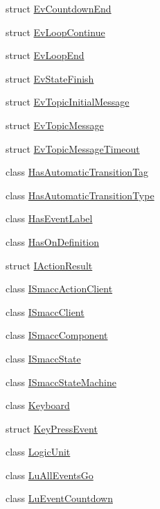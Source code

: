 \begin{DoxyCompactItemize}
\item 
struct \hyperlink{structsmacc_1_1EvCountdownEnd}{Ev\+Countdown\+End}
\item 
struct \hyperlink{structsmacc_1_1EvLoopContinue}{Ev\+Loop\+Continue}
\item 
struct \hyperlink{structsmacc_1_1EvLoopEnd}{Ev\+Loop\+End}
\item 
struct \hyperlink{structsmacc_1_1EvStateFinish}{Ev\+State\+Finish}
\item 
struct \hyperlink{structsmacc_1_1EvTopicInitialMessage}{Ev\+Topic\+Initial\+Message}
\item 
struct \hyperlink{structsmacc_1_1EvTopicMessage}{Ev\+Topic\+Message}
\item 
struct \hyperlink{structsmacc_1_1EvTopicMessageTimeout}{Ev\+Topic\+Message\+Timeout}
\item 
class \hyperlink{classsmacc_1_1HasAutomaticTransitionTag}{Has\+Automatic\+Transition\+Tag}
\item 
class \hyperlink{classsmacc_1_1HasAutomaticTransitionType}{Has\+Automatic\+Transition\+Type}
\item 
class \hyperlink{classsmacc_1_1HasEventLabel}{Has\+Event\+Label}
\item 
class \hyperlink{classsmacc_1_1HasOnDefinition}{Has\+On\+Definition}
\item 
struct \hyperlink{structsmacc_1_1IActionResult}{I\+Action\+Result}
\item 
class \hyperlink{classsmacc_1_1ISmaccActionClient}{I\+Smacc\+Action\+Client}
\item 
class \hyperlink{classsmacc_1_1ISmaccClient}{I\+Smacc\+Client}
\item 
class \hyperlink{classsmacc_1_1ISmaccComponent}{I\+Smacc\+Component}
\item 
class \hyperlink{classsmacc_1_1ISmaccState}{I\+Smacc\+State}
\item 
class \hyperlink{classsmacc_1_1ISmaccStateMachine}{I\+Smacc\+State\+Machine}
\item 
class \hyperlink{classsmacc_1_1Keyboard}{Keyboard}
\item 
struct \hyperlink{structsmacc_1_1KeyPressEvent}{Key\+Press\+Event}
\item 
class \hyperlink{classsmacc_1_1LogicUnit}{Logic\+Unit}
\item 
class \hyperlink{classsmacc_1_1LuAllEventsGo}{Lu\+All\+Events\+Go}
\item 
class \hyperlink{classsmacc_1_1LuEventCountdown}{Lu\+Event\+Countdown}
\item 

\end{DoxyCompactItemize}
